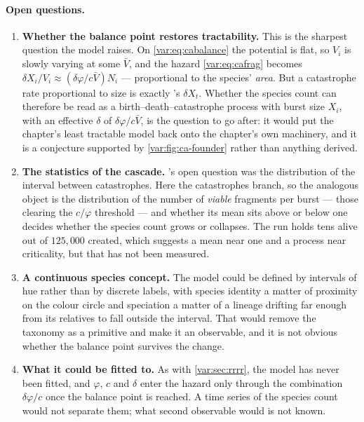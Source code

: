 \paragraph{Open questions.}\label{var:rem:open-ca}
\begin{enumerate}[leftmargin=1.6em,itemsep=0.2em,topsep=0.2em]
\item \textbf{Whether the balance point restores tractability.} This is the
sharpest question the model raises. On \cref{var:eq:cabalance} the potential
is flat, so $V_i$ is slowly varying at some $\bar V$, and the hazard
\cref{var:eq:cafrag} becomes
$\delta X_i/V_i\approx(\delta\varphi/c\bar V)N_i$ --- proportional to the
species' \emph{area}. But a catastrophe rate proportional to size is exactly
\ChCore{}'s $\delta X_t$. Whether the species count can therefore be read as
a birth--death--catastrophe process with burst size $X_i$, with an effective
$\delta$ of $\delta\varphi/c\bar V$, is the question to go after: it would
put the chapter's least tractable model back onto the chapter's own
machinery, and it is a conjecture supported by
\cref{var:fig:ca-founder} rather than anything derived.
\item \textbf{The statistics of the cascade.} 's open
question was the distribution of the interval between catastrophes. Here the
catastrophes branch, so the analogous object is the distribution of the
number of \emph{viable} fragments per burst --- those clearing the
$c/\varphi$ threshold --- and whether its mean sits above or below one
decides whether the species count grows or collapses. The run holds tens
alive out of $125{,}000$ created, which suggests a mean near one and a
process near criticality, but that has not been measured.
\item \textbf{A continuous species concept.} The model could be defined by
intervals of hue rather than by discrete labels, with species identity a
matter of proximity on the colour circle and speciation a matter of a
lineage drifting far enough from its relatives to fall outside the interval.
That would remove the taxonomy as a primitive and make it an observable, and
it is not obvious whether the balance point survives the change.
\item \textbf{What it could be fitted to.} As with \cref{var:sec:rrrr}, the
model has never been fitted, and $\varphi$, $c$ and $\delta$ enter the hazard
only through the combination $\delta\varphi/c$ once the balance point is
reached. A time series of the species count would not separate them; what
second observable would is not known.
\end{enumerate}

\FloatBarrier
